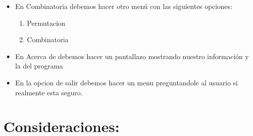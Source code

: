 \documentclass[10pt,a4paper]{article}
\begin{document}
\begin{itemize}
	\item En Combinatoria debemos hacer otro menú con las siguientes opciones:
	\begin{enumerate}
		\item Permutacion
		\item Combinatoria
	\end{enumerate}
	
	\item En Acerca de debemos hacer un pantallazo mostrando nuestro información y la del programa
	
	\item En la opcion de salir debemos hacer un menu preguntandole al usuario si realmente esta seguro.
	
\end{itemize}

\section{Consideraciones:}
\end{document}
